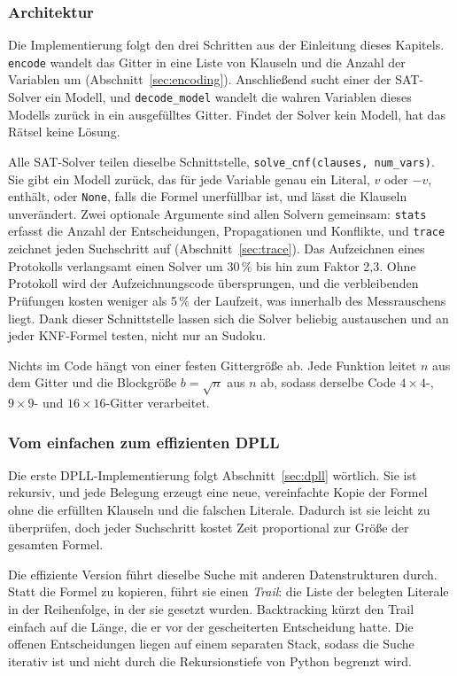 \subsubsection{Architektur} \label{sec:architecture}

Die Implementierung folgt den drei Schritten aus der Einleitung dieses Kapitels.
\texttt{encode} wandelt das Gitter in eine Liste von Klauseln und die Anzahl der Variablen um (Abschnitt~\ref{sec:encoding}).
Anschließend sucht einer der \acs{SAT}-Solver ein Modell, und \texttt{decode\_model} wandelt die wahren Variablen dieses Modells zurück in ein ausgefülltes Gitter.
Findet der Solver kein Modell, hat das Rätsel keine Lösung.

Alle \acs{SAT}-Solver teilen dieselbe Schnittstelle, \texttt{solve\_cnf(clauses, num\_vars)}.
Sie gibt ein Modell zurück, das für jede Variable genau ein Literal, $v$ oder $-v$, enthält, oder \texttt{None}, falls die Formel unerfüllbar ist, und lässt die Klauseln unverändert.
Zwei optionale Argumente sind allen Solvern gemeinsam: \texttt{stats} erfasst die Anzahl der Entscheidungen, Propagationen und Konflikte, und \texttt{trace} zeichnet jeden Suchschritt auf (Abschnitt~\ref{sec:trace}).
Das Aufzeichnen eines Protokolls verlangsamt einen Solver um 30\,\% bis hin zum Faktor 2,3.
Ohne Protokoll wird der Aufzeichnungscode übersprungen, und die verbleibenden Prüfungen kosten weniger als 5\,\% der Laufzeit, was innerhalb des Messrauschens liegt.
Dank dieser Schnittstelle lassen sich die Solver beliebig austauschen und an jeder \acs{KNF}-Formel testen, nicht nur an Sudoku.

Nichts im Code hängt von einer festen Gittergröße ab.
Jede Funktion leitet $n$ aus dem Gitter und die Blockgröße $b = \sqrt{n}$ aus $n$ ab, sodass derselbe Code $4 \times 4$-, $9 \times 9$- und $16 \times 16$-Gitter verarbeitet.

\subsubsection{Vom einfachen zum effizienten DPLL} \label{sec:dpll-impl}

Die erste DPLL-Implementierung folgt Abschnitt~\ref{sec:dpll} wörtlich.
Sie ist rekursiv, und jede Belegung erzeugt eine neue, vereinfachte Kopie der Formel ohne die erfüllten Klauseln und die falschen Literale.
Dadurch ist sie leicht zu überprüfen, doch jeder Suchschritt kostet Zeit proportional zur Größe der gesamten Formel.

Die effiziente Version führt dieselbe Suche mit anderen Datenstrukturen durch.
Statt die Formel zu kopieren, führt sie einen \emph{Trail}: die Liste der belegten Literale in der Reihenfolge, in der sie gesetzt wurden.
Backtracking kürzt den Trail einfach auf die Länge, die er vor der gescheiterten Entscheidung hatte.
Die offenen Entscheidungen liegen auf einem separaten Stack, sodass die Suche iterativ ist und nicht durch die Rekursionstiefe von Python begrenzt wird.


